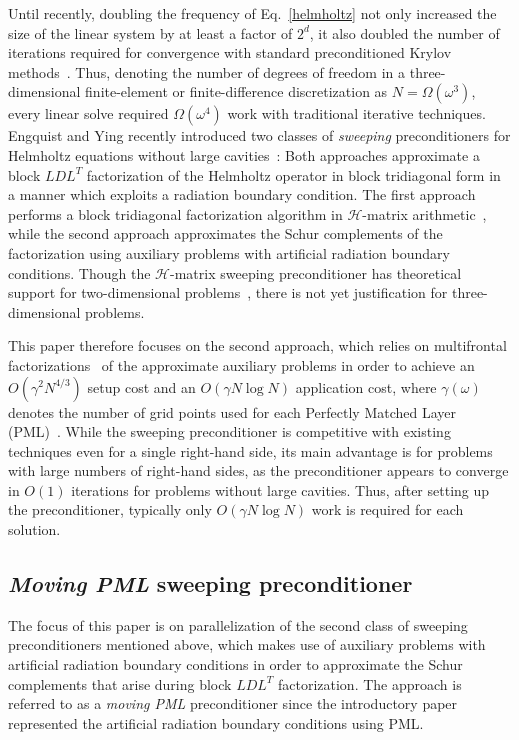 Until recently, doubling the frequency of Eq.\ \eqref{helmholtz} not only 
increased the size of the linear system by at least a factor of $2^d$, it also 
doubled the number of iterations required for convergence with standard 
preconditioned Krylov methods~\cite{BollhoeferGroteSchenk-ILU,Erlangga-advances,ErnstGander-classical}. 
Thus, denoting the number of degrees of freedom in a three-dimensional 
finite-element or finite-difference discretization as $N = \Omega(\omega^3)$,
every linear solve required $\Omega(\omega^4)$ work with traditional iterative 
techniques.
Engquist and Ying recently introduced two classes of {\em sweeping} 
preconditioners for Helmholtz equations without large 
cavities~\cite{EngquistYing-HMat,EngquistYing-PML}: Both approaches 
approximate a block $LDL^T$ factorization of the Helmholtz operator in 
block tridiagonal form in a manner which exploits a radiation boundary 
condition. 
The first approach performs a block tridiagonal factorization algorithm in 
$\mathcal{H}$-matrix arithmetic~\cite{Hackbusch-HMat,Grasedyck-HMat}, 
while the second approach approximates the Schur complements of the 
factorization using auxiliary problems with artificial radiation boundary 
conditions. 
Though the $\mathcal{H}$-matrix sweeping preconditioner has theoretical 
support for two-dimensional 
problems~\cite{EngquistYing-HMat,MartinssonRokhlin-elongated}, 
there is not yet justification for three-dimensional problems. 

This paper therefore focuses on the second approach, which relies on 
multifrontal factorizations~\cite{Liu-review,Schreiber-etree,DuffReid-multifrontal,George-nested} 
of the approximate auxiliary problems in order to achieve an 
$O(\gamma^2 N^{4/3})$ setup cost and an $O(\gamma N \log N)$ application 
cost, where $\gamma(\omega)$ denotes the number of grid points used for each 
Perfectly Matched Layer (PML)~\cite{Johnson-PML}. While the sweeping 
preconditioner is competitive with existing techniques even for a single 
right-hand side, its main advantage is for problems with large numbers of 
right-hand sides, as the preconditioner appears to converge in $O(1)$ 
iterations for problems without large cavities. Thus, after setting up 
the preconditioner, typically only $O(\gamma N \log N)$ work is required for 
each solution.

\subsection{{\em Moving PML} sweeping preconditioner}
The focus of this paper is on parallelization of the second class of sweeping
preconditioners mentioned above, which makes use of auxiliary problems with 
artificial radiation boundary conditions in order to approximate the Schur 
complements that arise during block $LDL^T$ factorization. The approach is 
referred to as a {\em moving PML} preconditioner since the introductory paper
represented the artificial radiation boundary conditions using PML.

